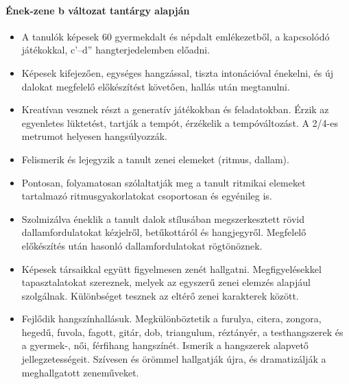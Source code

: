 \paragraph{Ének-zene  b változat tantárgy alapján}
\begin{itemize}
\item A tanulók képesek 60 gyermekdalt és népdalt emlékezetből, a kapcsolódó játékokkal, c’–d” hangterjedelemben előadni.
\item Képesek kifejezően, egységes hangzással, tiszta intonációval énekelni, és új dalokat megfelelő előkészítést követően, hallás után megtanulni.
\item Kreatívan vesznek részt a generatív játékokban és feladatokban. Érzik az egyenletes lüktetést, tartják a tempót, érzékelik a tempóváltozást. A 2/4-es metrumot helyesen hangsúlyozzák.
\item Felismerik és lejegyzik a tanult zenei elemeket (ritmus, dallam).
\item Pontosan, folyamatosan szólaltatják meg a tanult ritmikai elemeket tartalmazó ritmusgyakorlatokat csoportosan és egyénileg is.
\item Szolmizálva éneklik a tanult dalok stílusában megszerkesztett rövid dallamfordulatokat kézjelről, betűkottáról és hangjegyről. Megfelelő előkészítés után hasonló dallamfordulatokat rögtönöznek.
\item Képesek társaikkal együtt figyelmesen zenét hallgatni. Megfigyelésekkel tapasztalatokat szereznek, melyek az egyszerű zenei elemzés alapjául szolgálnak. Különbséget tesznek az eltérő zenei karakterek között.
\item Fejlődik hangszínhallásuk. Megkülönböztetik a furulya, citera, zongora, hegedű, fuvola, fagott, gitár, dob, triangulum, réztányér, a testhangszerek és a gyermek-, női, férfihang hangszínét. Ismerik a hangszerek alapvető jellegzetességeit. Szívesen és örömmel hallgatják újra, és dramatizálják a meghallgatott zeneműveket.
\end{itemize}
